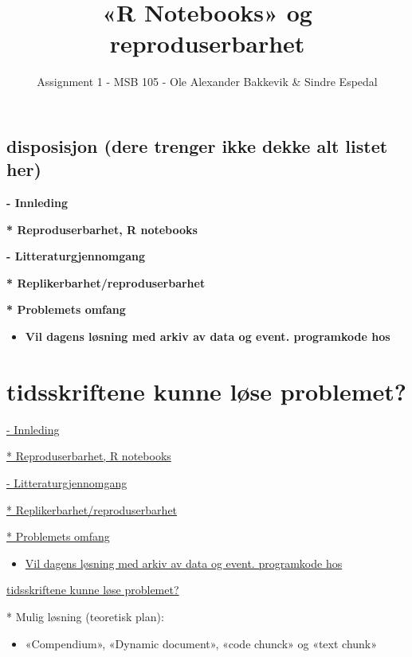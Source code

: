\documentclass[
  12pt,
  norsk,
]{article}
\title{«R Notebooks» og reproduserbarhet}
\author{Assignment 1 - MSB 105 - Ole Alexander Bakkevik \& Sindre
Espedal}
\date{}
\providecommand{\tightlist}{%
  \setlength{\itemsep}{0pt}\setlength{\parskip}{0pt}}
\begin{document}
\maketitle

\hypertarget{disposisjon-dere-trenger-ikke-dekke-alt-listet-her}{%
\subsection{disposisjon (dere trenger ikke dekke alt listet
her)}\label{disposisjon-dere-trenger-ikke-dekke-alt-listet-her}}

\textbf{- Innleding}

\textbf{* Reproduserbarhet, R notebooks}

\textbf{- Litteraturgjennomgang}

\textbf{* Replikerbarhet/reproduserbarhet}

\textbf{* Problemets omfang}

\begin{itemize}
\tightlist
\item
  \textbf{Vil dagens løsning med arkiv av data og event. programkode
  hos}
\end{itemize}

\hypertarget{tidsskriftene-kunne-luxf8se-problemet}{%
\section{\texorpdfstring{\textbf{tidsskriftene kunne løse
problemet?}}{tidsskriftene kunne løse problemet?}}\label{tidsskriftene-kunne-luxf8se-problemet}}

\underline{- Innleding}

\underline{* Reproduserbarhet, R notebooks}

\underline{- Litteraturgjennomgang}

\underline{* Replikerbarhet/reproduserbarhet}

\underline{* Problemets omfang}

\begin{itemize}
\tightlist
\item
  \underline{Vil dagens løsning med arkiv av data og event. programkode
  hos}
\end{itemize}

\underline{tidsskriftene kunne løse problemet?}

* Mulig løsning (teoretisk plan):

\begin{itemize}
\tightlist
\item
  «Compendium», «Dynamic document», «code chunck» og «text chunk»
\end{itemize}
\end{document}
